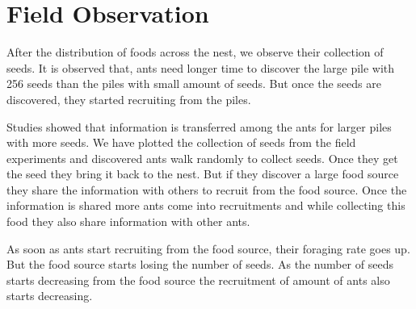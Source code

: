 \section{\label{section:Field Observation}Field Observation}
After the distribution of foods across the nest, we observe their collection of seeds. It is observed that, ants need longer time to discover the large pile with 256 seeds than the piles with small amount of seeds. But once the seeds are discovered, they started recruiting from the piles.\par
Studies showed that information is transferred among the ants for larger piles with more seeds. We have plotted the collection of seeds from the field experiments and discovered ants walk randomly to collect seeds. Once they get the seed they bring it back to the nest. But if they discover a large food source they share the information with others to recruit from the food source. Once the information is shared more ants come into recruitments and while collecting this food they also share information with other ants.\par
As soon as ants start recruiting from the food source, their foraging rate goes up. But the food source starts losing the number of seeds. As the number of seeds starts decreasing from the food source the recruitment of amount of ants also starts decreasing.
